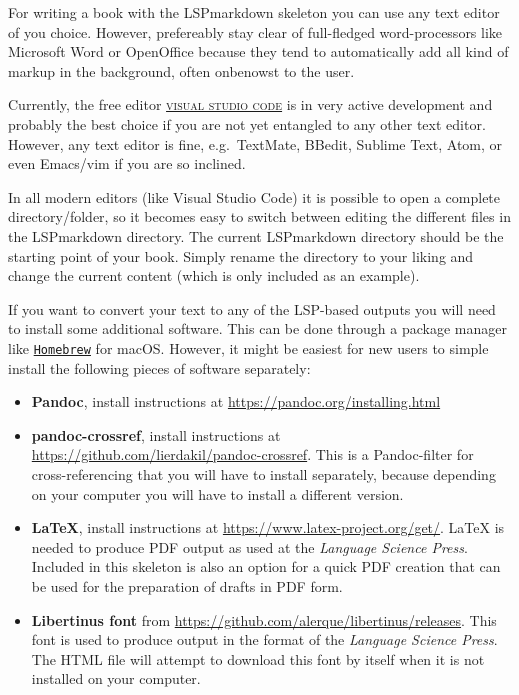 For\paragraphnumber{[1.8]} writing a book with the LSPmarkdown skeleton
you can use any text editor of you choice. However, prefereably stay
clear of full-fledged word-processors like Microsoft Word or OpenOffice
because they tend to automatically add all kind of markup in the
background, often onbenowst to the user.

Currently,\paragraphnumber{[1.9]} the free editor
\href{https://code.visualstudio.com}{\textsc{visual studio code}} is in
very active development and probably the best choice if you are not yet
entangled to any other text editor. However, any text editor is fine,
e.g.~TextMate, BBedit, Sublime Text, Atom, or even Emacs/vim if you are
so inclined.

In\paragraphnumber{[1.10]} all modern editors (like Visual Studio Code)
it is possible to open a complete directory/folder, so it becomes easy
to switch between editing the different files in the LSPmarkdown
directory. The current LSPmarkdown directory should be the starting
point of your book. Simply rename the directory to your liking and
change the current content (which is only included as an example).

If\paragraphnumber{[1.11]} you want to convert your text to any of the
LSP-based outputs you will need to install some additional software.
This can be done through a package manager like
\href{https://brew.sh}{\texttt{Homebrew}} for macOS. However, it might
be easiest for new users to simple install the following pieces of
software separately:

\begin{itemize}
\tightlist
\item
  \textbf{Pandoc}, install instructions at
  \url{https://pandoc.org/installing.html}
\item
  \textbf{pandoc-crossref}, install instructions at
  \url{https://github.com/lierdakil/pandoc-crossref}. This is a
  Pandoc-filter for cross-referencing that you will have to install
  separately, because depending on your computer you will have to
  install a different version.
\item
  \textbf{LaTeX}, install instructions at
  \url{https://www.latex-project.org/get/}. LaTeX is needed to produce
  PDF output as used at the \emph{Language Science Press}. Included in
  this skeleton is also an option for a quick PDF creation that can be
  used for the preparation of drafts in PDF form.
\item
  \textbf{Libertinus font} from
  \url{https://github.com/alerque/libertinus/releases}. This font is
  used to produce output in the format of the \emph{Language Science
  Press}. The HTML file will attempt to download this font by itself
  when it is not installed on your computer.
\end{itemize}

